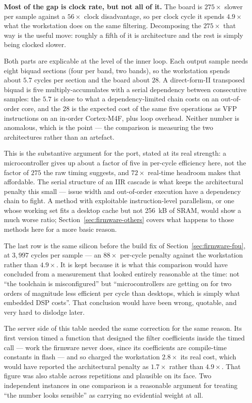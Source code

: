 \documentclass[11pt]{article}
\begin{document}
\textbf{Most of the gap is clock rate, but not all of it.} The board is
$275\times$ slower per sample against a $56\times$ clock disadvantage, so per
clock cycle it spends $4.9\times$ what the workstation does on the same
filtering. Decomposing the $275\times$ that way is the useful move: roughly a
fifth of it is architecture and the rest is simply being clocked slower.

Both parts are explicable at the level of the inner loop. Each output sample
needs eight biquad sections (four per band, two bands), so the workstation
spends about $5.7$ cycles per section and the board about $28$. A
direct-form-II transposed biquad is five multiply-accumulates with a serial
dependency between consecutive samples: the $5.7$ is close to what a
dependency-limited chain costs on an out-of-order core, and the $28$ is the
expected cost of the same five operations as VFP instructions on an in-order
Cortex-M4F, plus loop overhead. Neither number is anomalous, which is the
point --- the comparison is measuring the two architectures rather than an
artefact.

This is the substantive argument for the port, stated at its real strength: a
microcontroller gives up about a factor of five in per-cycle efficiency here,
not the factor of $275$ the raw timing suggests, and $72\times$ real-time
headroom makes that affordable. The serial structure of an IIR cascade is
what keeps the architectural penalty this small --- issue width and
out-of-order execution have a dependency chain to fight. A method with
exploitable instruction-level parallelism, or one whose working set fits a
desktop cache but not 256~kB of SRAM, would show a much worse ratio;
Section~\ref{sec:firmware-others} covers what happens to those methods here
for a more basic reason.

The last row is the same silicon before the build fix of
Section~\ref{sec:firmware-fpu}, at $3{,}997$ cycles per sample --- an
$88\times$ per-cycle penalty against the workstation rather than
$4.9\times$. It is kept because it is what this comparison would have
concluded from a measurement that looked entirely reasonable at the time: not
``the toolchain is misconfigured'' but ``microcontrollers are getting on for
two orders of magnitude less efficient per cycle than desktops, which is
simply what embedded DSP costs''. That conclusion would have been wrong,
quotable, and very hard to dislodge later.

The server side of this table needed the same correction for the same
reason. Its first version timed a function that designed the filter
coefficients inside the timed call --- work the firmware never does, since
its coefficients are compile-time constants in flash --- and so charged the
workstation $2.8\times$ its real cost, which would have reported the
architectural penalty as $1.7\times$ rather than $4.9\times$. That figure was
also stable across repetitions and plausible on its face. Two independent
instances in one comparison is a reasonable argument for treating ``the
number looks sensible'' as carrying no evidential weight at all.
\end{document}
